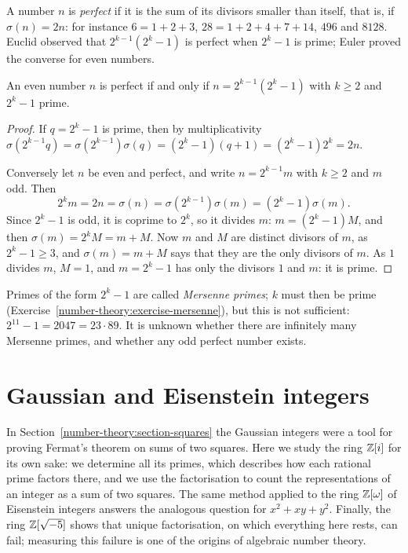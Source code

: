 A number $n$ is \emph{perfect} if it is the sum of its divisors smaller than itself, that is, if $\sigma(n) = 2n$: for instance $6 = 1 + 2 + 3$, $28 = 1 + 2 + 4 + 7 + 14$, $496$ and $8128$. Euclid observed
that $2^{k-1}(2^k - 1)$ is perfect when $2^k - 1$ is prime; Euler proved the converse for even numbers.

\begin{theorem}\label{number-theory:theorem-perfect}
An even number $n$ is perfect if and only if $n = 2^{k-1}(2^k - 1)$ with $k \geq 2$ and $2^k - 1$ prime.
\end{theorem}

\begin{proof}
If $q = 2^k - 1$ is prime, then by multiplicativity $\sigma(2^{k-1}q) = \sigma(2^{k-1})\sigma(q) = (2^k - 1)(q + 1) = (2^k - 1)2^k = 2n$.

Conversely let $n$ be even and perfect, and write $n = 2^{k-1}m$ with $k \geq 2$ and $m$ odd. Then
\[
2^km = 2n = \sigma(n) = \sigma(2^{k-1})\sigma(m) = (2^k - 1)\sigma(m).
\]
Since $2^k - 1$ is odd, it is coprime to $2^k$, so it divides $m$: $m = (2^k - 1)M$, and then $\sigma(m) = 2^kM = m + M$. Now $m$ and $M$ are distinct divisors of $m$, as $2^k - 1 \geq 3$, and
$\sigma(m) = m + M$ says that they are the only divisors of $m$. As $1$ divides $m$, $M = 1$, and $m = 2^k - 1$ has only the divisors $1$ and $m$: it is prime.
\end{proof}

\begin{remark}\label{number-theory:remark-perfect}
Primes of the form $2^k - 1$ are called \emph{Mersenne primes}; $k$ must then be prime (Exercise~\ref{number-theory:exercise-mersenne}), but this is not sufficient: $2^{11} - 1 = 2047 = 23 \cdot 89$. It is
unknown whether there are infinitely many Mersenne primes, and whether any odd perfect number exists.
\end{remark}

\section{Gaussian and Eisenstein integers}\label{number-theory:section-gaussian}

In Section~\ref{number-theory:section-squares} the Gaussian integers were a tool for proving Fermat's theorem on sums of two squares. Here we study the ring $\mathbb{Z}[i]$ for its own sake: we determine
all its primes, which describes how each rational prime factors there, and we use the factorisation to count the representations of an integer as a sum of two squares. The same method applied to the
ring $\mathbb{Z}[\omega]$ of Eisenstein integers answers the analogous question for $x^2 + xy + y^2$. Finally, the ring $\mathbb{Z}[\sqrt{-5}]$ shows that unique factorisation, on which everything here rests, can fail;
measuring this failure is one of the origins of algebraic number theory.

